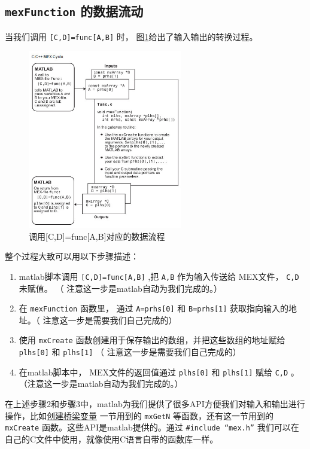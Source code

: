 \documentclass[10pt,a4paper,UTF8]{article}
\begin{document}
\subsection{\texttt{mexFunction} 的数据流动}
\label{sec:orgheadline9}


当我们调用 \texttt{[C,D]=func[A,B]} 时， 图\ref{fig:orgparagraph2}给出了输入输出的转换过程。
\begin{figure}[htb]
\centering
\includegraphics[width=0.6\textwidth]{../../img/20151110mexdataflow.jpg}
\caption{\label{fig:orgparagraph2}
调用[C,D]=func[A,B]对应的数据流程}
\end{figure}

整个过程大致可以用以下步骤描述：
\begin{enumerate}
\item matlab脚本调用 \texttt{[C,D]=func[A,B]} ,把 \texttt{A,B} 作为输入传送给 MEX文件， \texttt{C,D} 未赋值。 （ 注意这一步是matlab自动为我们完成的。）
\item 在 \texttt{mexFunction} 函数里， 通过 \texttt{A=prhs[0]} 和 \texttt{B=prhs[1]} 获取指向输入的地址。（ 注意这一步是需要我们自己完成的）
\item 使用 \texttt{mxCreate} 函数创建用于保存输出的数组，并把这些数组的地址赋给 \texttt{plhs[0]} 和 \texttt{plhs[1]} （ 注意这一步是需要我们自己完成的）
\item 在matlab脚本中， MEX文件的返回值通过 \texttt{plhs[0]} 和 \texttt{plhs[1]} 赋给 \texttt{C,D} 。（注意这一步是matlab自动为我们完成的。）
\end{enumerate}

在上述步骤2和步骤3中，matlab为我们提供了很多API方便我们对输入和输出进行操作，比如\hyperref[orgtarget1]{创建桥梁变量} 一节用到的 \texttt{mxGetN} 等函数，还有这一节用到的 \texttt{mxCreate} 函数。这些API是matlab提供的。通过 \texttt{\#include “mex.h”} 我们可以在自己的C文件中使用，就像使用C语言自带的函数库一样。
\end{document}
